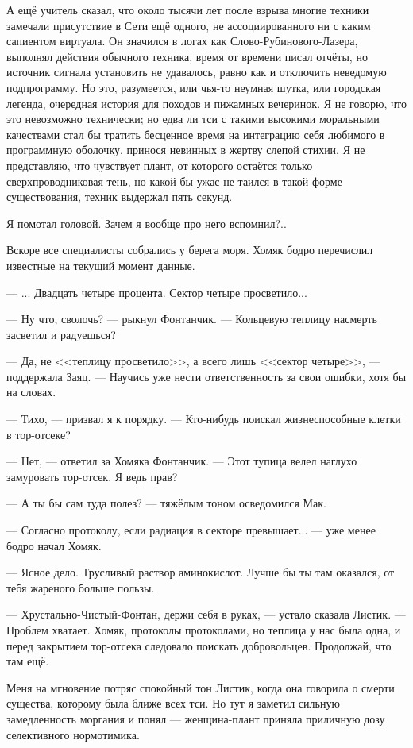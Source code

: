 А ещё учитель сказал, что около тысячи лет после взрыва многие техники замечали присутствие в Сети ещё одного, не ассоциированного ни с каким сапиентом виртуала.
Он значился в логах как Слово-Рубинового-Лазера, выполнял действия обычного техника, время от времени писал отчёты, но источник сигнала установить не удавалось, равно как и отключить неведомую подпрограмму.
Но это, разумеется, или чья-то неумная шутка, или городская легенда, очередная история для походов и пижамных вечеринок.
Я не говорю, что это невозможно технически;
но едва ли тси с такими высокими моральными качествами стал бы тратить бесценное время на интеграцию себя любимого в программную оболочку, принося невинных в жертву слепой стихии.
Я не представляю, что чувствует плант, от которого остаётся только сверхпроводниковая тень, но какой бы ужас не таился в такой форме существования, техник выдержал пять секунд.

Я помотал головой.
Зачем я вообще про него вспомнил?..

Вскоре все специалисты собрались у берега моря.
Хомяк бодро перечислил известные на текущий момент данные.

--- ... Двадцать четыре процента.
Сектор четыре просветило...

--- Ну что, сволочь? --- рыкнул Фонтанчик.
--- Кольцевую теплицу насмерть засветил и радуешься?

--- Да, не <<теплицу просветило>>, а всего лишь <<сектор четыре>>, --- поддержала Заяц.
--- Научись уже нести ответственность за свои ошибки, хотя бы на словах.

--- Тихо, --- призвал я к порядку.
--- Кто-нибудь поискал жизнеспособные клетки в тор-отсеке?

--- Нет, --- ответил за Хомяка Фонтанчик.
--- Этот тупица велел наглухо замуровать тор-отсек.
Я ведь прав?

--- А ты бы сам туда полез? --- тяжёлым тоном осведомился Мак.

--- Согласно протоколу, если радиация в секторе превышает... --- уже менее бодро начал Хомяк.

--- Ясное дело.
Трусливый раствор аминокислот.
Лучше бы ты там оказался, от тебя жареного больше пользы.

--- Хрустально-Чистый-Фонтан, держи себя в руках, --- устало сказала Листик.
--- Проблем хватает.
Хомяк, протоколы протоколами, но теплица у нас была одна, и перед закрытием тор-отсека следовало поискать добровольцев.
Продолжай, что там ещё.

Меня на мгновение потряс спокойный тон Листик, когда она говорила о смерти существа, которому была ближе всех тси.
Но тут я заметил сильную замедленность моргания и понял --- женщина-плант приняла приличную дозу селективного нормотимика.

